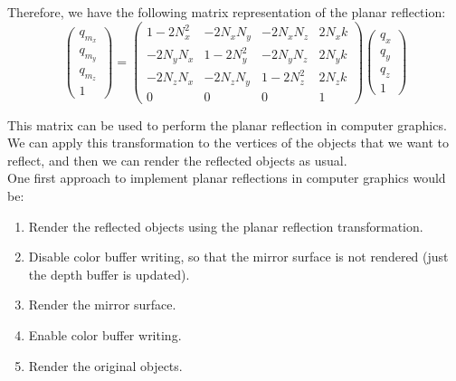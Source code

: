 Therefore, we have the following matrix representation of the planar reflection:
\begin{equation*}
    \begin{pmatrix}
        q_{m_x}\\
        q_{m_y}\\
        q_{m_z}\\
        1
    \end{pmatrix} =
    \begin{pmatrix}
        1-2N_x^2 & -2N_xN_y & -2N_xN_z & 2N_xk\\
        -2N_yN_x & 1-2N_y^2 & -2N_yN_z & 2N_yk\\
        -2N_zN_x & -2N_zN_y & 1-2N_z^2 & 2N_zk\\
        0 & 0 & 0 & 1
    \end{pmatrix}
    \begin{pmatrix}
        q_x\\
        q_y\\
        q_z\\
        1
    \end{pmatrix}
\end{equation*}

This matrix can be used to perform the planar reflection in computer graphics. We can apply this transformation to the vertices of the objects that we want to reflect, and then we can render the reflected objects as usual.\\

One first approach to implement planar reflections in computer graphics would be:
\begin{enumerate}
    \item Render the reflected objects using the planar reflection transformation.
    \item Disable color buffer writing, so that the mirror surface is not rendered (just the depth buffer is updated).
    \item Render the mirror surface.
    \item Enable color buffer writing.
    \item Render the original objects.
\end{enumerate}

